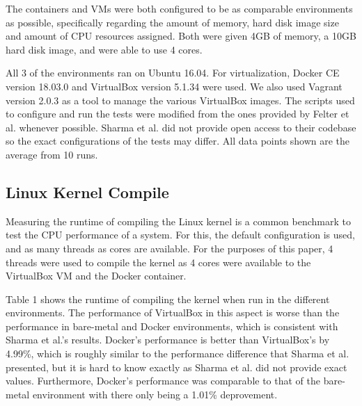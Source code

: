 \documentclass{sig-alternate-10pt}
\begin{document}
The containers and VMs were both configured to be as comparable environments as possible, specifically regarding the amount of memory, hard disk image size and amount of CPU resources assigned. Both were given 4GB of memory, a 10GB hard disk image, and were able to use 4 cores. 

All 3 of the environments ran on Ubuntu 16.04. For virtualization, Docker CE version 18.03.0 and VirtualBox version 5.1.34 were used. We also used Vagrant version 2.0.3 as a tool to manage the various VirtualBox images. The scripts used to configure and run the tests were modified from the ones provided by Felter et al. whenever possible\cite{felter:git}. Sharma et al. did not provide open access to their codebase so the exact configurations of the tests may differ. All data points shown are the average from 10 runs.

\subsection{Linux Kernel Compile}
Measuring the runtime of compiling the Linux kernel is a common benchmark to test the CPU performance of a system. For this, the default configuration is used, and as many threads as cores are available. For the purposes of this paper, 4 threads were used to compile the kernel as 4 cores were available to the VirtualBox VM and the Docker container. 

Table 1 shows the runtime of compiling the kernel when run in the different environments. The performance of VirtualBox in this aspect is worse than the performance in bare-metal and Docker environments, which is consistent with Sharma et al.'s results. Docker's performance is better than VirtualBox's by 4.99\%, which is roughly similar to the performance difference that Sharma et al. presented, but it is hard to know exactly as Sharma et al. did not provide exact values. Furthermore, Docker's performance was comparable to that of the bare-metal environment with there only being a 1.01\% deprovement.
\end{document}
